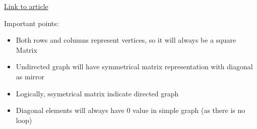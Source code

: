 \documentclass{article}
\theoremstyle{plain}%
\theoremstyle{definition}
\theoremstyle{remark}
\begin{document}
	\href{https://www.geeksforgeeks.org/graph-and-its-representations/}{Link to article}

	Important points:

	\begin{itemize}
		\item Both rows and columns represent vertices, so it will always be a square Matrix
		\item Undirected graph will have symmetrical matrix representation with diagonal as mirror
		\item Logically, ssymetrical matrix indicate directed graph
		\item Diagonal elements will always have 0 value in simple graph (as there is no loop)
	\end{itemize}

	\newpage
	
	
	
	
\end{document}
